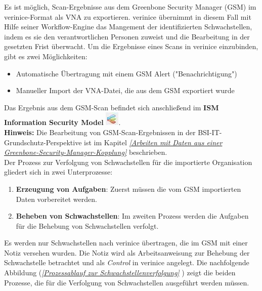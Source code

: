 \documentclass[a4paper,10pt]{book}
\begin{document}
Es ist möglich, Scan-Ergebnisse aus dem Greenbone Security Manager (GSM) im
verinice-Format als VNA zu exportieren. verinice übernimmt in diesem Fall mit
Hilfe seiner Workflow-Engine das Mangement der identifizierten Schwachstellen,
indem es sie den verantwortlichen Personen zuweist und die Bearbeitung in der
gesetzten Frist überwacht. Um die Ergebnisse eines Scans in verinice
einzubinden, gibt es zwei Möglichkeiten:
 \begin{itemize}
 \item Automatische Übertragung mit einem GSM Alert ("Benachrichtigung")
 \item Manueller Import der VNA-Datei, die aus dem GSM exportiert wurde
\end{itemize}
Das Ergebnis aus dem GSM-Scan befindet sich anschließend im \textbf{ISM Information Security Model} \includegraphics[height=2ex]{Icon/Informationssicherheitsmodell.png}.
\newline\\
\textbf{Hinweis:} Die Bearbeitung von GSM-Scan-Ergebnissen in der BSI-IT-Grundschutz-Perspektive ist im Kapitel {\em \ref{Arbeiten mit Daten aus einer Greenbone-Security-Manager-Kopplung} } beschrieben.
\newline\\
Der Prozess zur Verfolgung von Schwachstellen für die importierte Organisation gliedert sich in zwei Unterprozesse:
\begin{enumerate}
 \item \textbf{Erzeugung von Aufgaben}: Zuerst müssen die vom GSM importierten
 Daten vorbereitet werden.
 \item \textbf{Beheben von Schwachstellen}: Im zweiten Prozess werden die
 Aufgaben für die Behebung von Schwachstellen verfolgt.
\end{enumerate}
Es werden nur Schwachstellen nach verinice übertragen, die im GSM mit einer Notiz versehen wurden. Die Notiz wird als Arbeitsanweisung zur Behebung der Schwachstelle betrachtet und als {\em Control} in verinice angelegt.
Die nachfolgende Abbildung ({\em \ref{Prozessablauf zur Schwachstellenverfolgung} }) zeigt die beiden Prozesse, die für die Verfolgung von Schwachstellen ausgeführt werden müssen.
\end{document}

